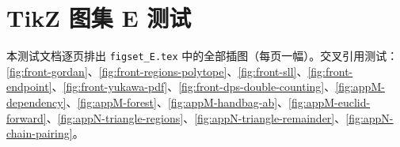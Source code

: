 

\chapter{TikZ 图集 E 测试}
本测试文档逐页排出 \texttt{figset\_E.tex} 中的全部插图（每页一幅）。交叉引用测试：\cref{fig:front-gordan}、\cref{fig:front-regions-polytope}、\cref{fig:front-sll}、\cref{fig:front-endpoint}、\cref{fig:front-yukawa-pdf}、\cref{fig:front-dps-double-counting}、\cref{fig:appM-dependency}、\cref{fig:appM-forest}、\cref{fig:appM-handbag-ab}、\cref{fig:appM-euclid-forward}、\cref{fig:appN-triangle-regions}、\cref{fig:appN-triangle-remainder}、\cref{fig:appN-chain-pairing}。

\clearpage
\clearpage
\clearpage
\clearpage
\clearpage
\clearpage
\clearpage
\clearpage
\clearpage
\clearpage
\clearpage
\clearpage
\clearpage
\clearpage


